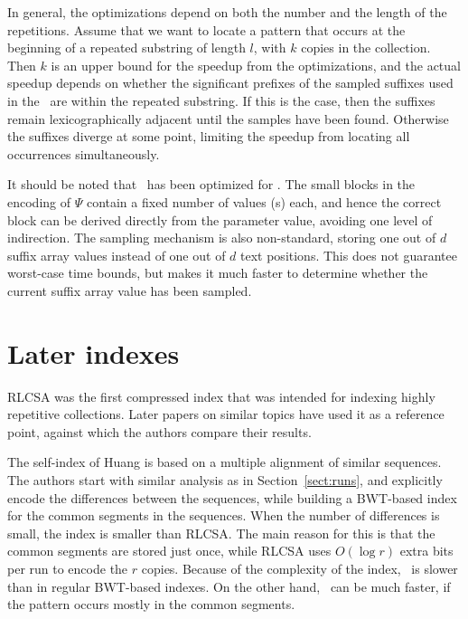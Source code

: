 In general, the optimizations depend on both the number and the length of the repetitions. Assume that we want to locate a pattern that occurs at the beginning of a repeated substring of length $l$, with $k$ copies in the collection. Then $k$ is an upper bound for the speedup from the optimizations, and the actual speedup depends on whether the significant prefixes of the sampled suffixes used in the \locate\ are within the repeated substring. If this is the case, then the suffixes remain lexicographically adjacent until the samples have been found. Otherwise the suffixes diverge at some point, limiting the speedup from locating all occurrences simultaneously.

It should be noted that \sadcsa\ has been optimized for \locate. The small blocks in the encoding of $\Psi$ contain a fixed number of values (\onebit{}s) each, and hence the correct block can be derived directly from the parameter value, avoiding one level of indirection. The sampling mechanism is also non-standard, storing one out of $d$ suffix array values instead of one out of $d$ text positions. This does not guarantee worst-case time bounds, but makes it much faster to determine whether the current suffix array value has been sampled.
\newpage


\section{Later indexes}

RLCSA was the first compressed index that was intended for indexing highly repetitive collections. Later papers on similar topics have used it as a reference point, against which the authors compare their results.

The self-index of Huang  is based on a multiple alignment of similar sequences. The authors start with similar analysis as in Section~\ref{sect:runs}, and explicitly encode the differences between the sequences, while building a BWT-based index for the common segments in the sequences. When the number of differences is small, the index is smaller than RLCSA. The main reason for this is that the common segments are stored just once, while RLCSA uses $O(\log r)$ extra bits per run to encode the $r$ copies. Because of the complexity of the index, \find\ is slower than in regular BWT-based indexes. On the other hand, \locate\ can be much faster, if the pattern occurs mostly in the common segments.

